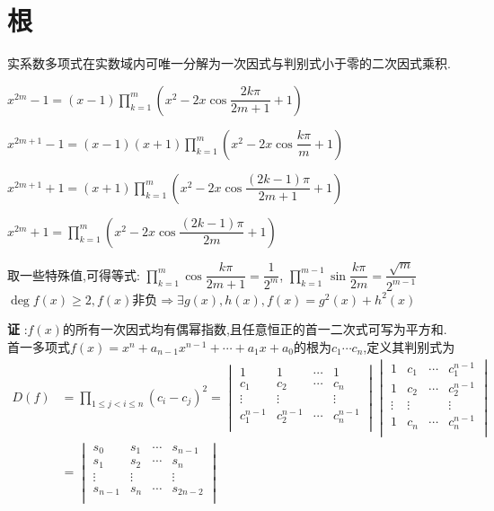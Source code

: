 \section{根}
实系数多项式在实数域内可唯一分解为一次因式与判别式小于零的二次因式乘积.

$ x^{2m}-1=(x-1) \prod_{k=1}^m{( x^2-2x\cos\dfrac{2k\pi}{2m+1}+1 )}$

$ x^{2m+1}-1 =(x-1)(x+1)\prod_{k=1}^m{(x^2-2x\cos\dfrac{k\pi}{m}+1)}$ 

$ x^{2m+1}+1=(x+1)\prod_{k=1}^m{( x^2-2x\cos\dfrac{(2k-1)\pi}{2m+1}+1 )}$

$ x^{2m}+1=\prod_{k=1}^m{(x^2-2x\cos\dfrac{(2k-1)\pi}{2m}+1)}$

取一些特殊值,可得等式:
$ \prod_{k=1}^m{\cos\dfrac{k\pi}{2m+1}}=\dfrac{1}{2^m}$,
$ \prod_{k=1}^{m-1}{\sin\dfrac{k\pi}{2m}}=\dfrac{\sqrt{m}}{2^{m-1}}$
\\

$\deg f(x)\ge 2 ,f(x)$非负$ \Rightarrow \exists g(x),h(x),f(x)=g^2(x)+h^2(x)$

{\bf 证 }:$ f(x)$的所有一次因式均有偶幂指数,且任意恒正的首一二次式可写为平方和.
\\

首一多项式$ f(x)=x^n+a_{n-1}x^{n-1}+\cdots+a_1x+a_0$的根为$ c_1\cdots c_n$,定义其判别式为
\[ \begin{aligned}
	D(f) & =\prod_{1\le j< i\le n}{(c_i-c_j)^2}=
		\begin{vmatrix} 
		1 & 1 & \cdots & 1\\
		c_1 & c_2 & \cdots & c_n \\
		\vdots & \vdots & & \vdots \\
		c_1^{n-1} & c_2^{n-1} & \cdots & c_n^{n-1}\\
		\end{vmatrix}
		\begin{vmatrix}
		1 & c_1 & \cdots & c_1^{n-1}\\
		1 & c_2 & \cdots & c_2^{n-1}\\
		\vdots & \vdots & & \vdots \\
		1 & c_n & \cdots & c_n^{n-1}\\
		\end{vmatrix} \\
		& = \begin{vmatrix}
			s_0 & s_1 & \cdots & s_{n-1}\\
			s_1 & s_2 & \cdots & s_{n}\\
			\vdots & \vdots & & \vdots \\
			s_{n-1} & s_{n} & \cdots & s_{2n-2}\\
			\end{vmatrix}
\end{aligned} \]

